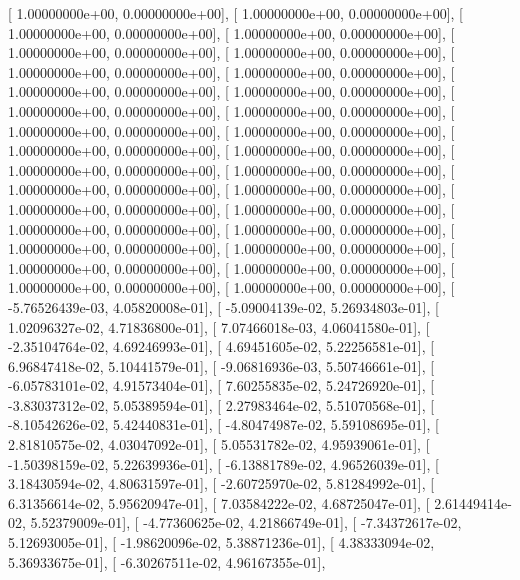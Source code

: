 \documentclass{article}
\begin{document}
       [  1.00000000e+00,   0.00000000e+00],
       [  1.00000000e+00,   0.00000000e+00],
       [  1.00000000e+00,   0.00000000e+00],
       [  1.00000000e+00,   0.00000000e+00],
       [  1.00000000e+00,   0.00000000e+00],
       [  1.00000000e+00,   0.00000000e+00],
       [  1.00000000e+00,   0.00000000e+00],
       [  1.00000000e+00,   0.00000000e+00],
       [  1.00000000e+00,   0.00000000e+00],
       [  1.00000000e+00,   0.00000000e+00],
       [  1.00000000e+00,   0.00000000e+00],
       [  1.00000000e+00,   0.00000000e+00],
       [  1.00000000e+00,   0.00000000e+00],
       [  1.00000000e+00,   0.00000000e+00],
       [  1.00000000e+00,   0.00000000e+00],
       [  1.00000000e+00,   0.00000000e+00],
       [  1.00000000e+00,   0.00000000e+00],
       [  1.00000000e+00,   0.00000000e+00],
       [  1.00000000e+00,   0.00000000e+00],
       [  1.00000000e+00,   0.00000000e+00],
       [  1.00000000e+00,   0.00000000e+00],
       [  1.00000000e+00,   0.00000000e+00],
       [  1.00000000e+00,   0.00000000e+00],
       [  1.00000000e+00,   0.00000000e+00],
       [  1.00000000e+00,   0.00000000e+00],
       [  1.00000000e+00,   0.00000000e+00],
       [  1.00000000e+00,   0.00000000e+00],
       [  1.00000000e+00,   0.00000000e+00],
       [  1.00000000e+00,   0.00000000e+00],
       [  1.00000000e+00,   0.00000000e+00],
       [ -5.76526439e-03,   4.05820008e-01],
       [ -5.09004139e-02,   5.26934803e-01],
       [  1.02096327e-02,   4.71836800e-01],
       [  7.07466018e-03,   4.06041580e-01],
       [ -2.35104764e-02,   4.69246993e-01],
       [  4.69451605e-02,   5.22256581e-01],
       [  6.96847418e-02,   5.10441579e-01],
       [ -9.06816936e-03,   5.50746661e-01],
       [ -6.05783101e-02,   4.91573404e-01],
       [  7.60255835e-02,   5.24726920e-01],
       [ -3.83037312e-02,   5.05389594e-01],
       [  2.27983464e-02,   5.51070568e-01],
       [ -8.10542626e-02,   5.42440831e-01],
       [ -4.80474987e-02,   5.59108695e-01],
       [  2.81810575e-02,   4.03047092e-01],
       [  5.05531782e-02,   4.95939061e-01],
       [ -1.50398159e-02,   5.22639936e-01],
       [ -6.13881789e-02,   4.96526039e-01],
       [  3.18430594e-02,   4.80631597e-01],
       [ -2.60725970e-02,   5.81284992e-01],
       [  6.31356614e-02,   5.95620947e-01],
       [  7.03584222e-02,   4.68725047e-01],
       [  2.61449414e-02,   5.52379009e-01],
       [ -4.77360625e-02,   4.21866749e-01],
       [ -7.34372617e-02,   5.12693005e-01],
       [ -1.98620096e-02,   5.38871236e-01],
       [  4.38333094e-02,   5.36933675e-01],
       [ -6.30267511e-02,   4.96167355e-01],
\end{document}
